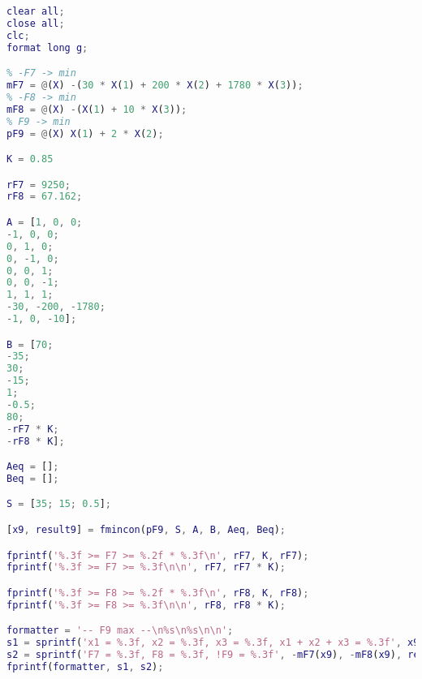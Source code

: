 \begin{lstlisting}[language={matlab}, caption={Решение задачи для критерия F9}, label={lst:0}, basicstyle={\footnotesize\ttfamily}, breaklines={true}]
clear all;
close all; 
clc;
format long g;

% -F7 -> min
mF7 = @(X) -(30 * X(1) + 200 * X(2) + 1780 * X(3));
% -F8 -> min
mF8 = @(X) -(X(1) + 10 * X(3));
% F9 -> min
pF9 = @(X) X(1) + 2 * X(2);

K = 0.85

rF7 = 9250;
rF8 = 67.162;

A = [1, 0, 0;
-1, 0, 0;
0, 1, 0;
0, -1, 0;
0, 0, 1;
0, 0, -1;
1, 1, 1;
-30, -200, -1780;
-1, 0, -10];

B = [70;
-35;
30;
-15;
1;
-0.5;
80;
-rF7 * K;
-rF8 * K];

Aeq = [];
Beq = [];

S = [35; 15; 0.5];

[x9, result9] = fmincon(pF9, S, A, B, Aeq, Beq);

fprintf('%.3f >= F7 >= %.2f * %.3f\n', rF7, K, rF7);
fprintf('%.3f >= F7 >= %.3f\n\n', rF7, rF7 * K);

fprintf('%.3f >= F8 >= %.2f * %.3f\n', rF8, K, rF8);
fprintf('%.3f >= F8 >= %.3f\n\n', rF8, rF8 * K);

formatter = '-- F9 max --\n%s\n%s\n\n';
s1 = sprintf('x1 = %.3f, x2 = %.3f, x3 = %.3f, x1 + x2 + x3 = %.3f', x9, sum(x9));
s2 = sprintf('F7 = %.3f, F8 = %.3f, !F9 = %.3f', -mF7(x9), -mF8(x9), result9); 
fprintf(formatter, s1, s2);
\end{lstlisting}


